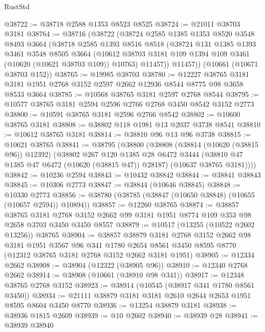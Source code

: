 \begin{lexlean}{RustStd}
\begin{coremodule}
@38722 := @38718 @2588 @1353 @8523 @8525
@38724 := @21011 @38703 @3181
@38764 := @38716
    (@38722
      (@38724
        @2585
        @1385
        @1353
        @8520
        @3548
        @8493
        @3664
        (@38718
          @2585
          @1393
          @8516
          @8518
          (@38724
            @131
            @1385
            @1393
            @3461
            @3548
            @8505
            @3664
            (@10612 @38703 @3181 @109 @1394 @109 @3461 (@10620 (@10621 @38703 @109)) @10763)
            @11457))
        @11457))
    (@10661 (@10671 @38703 @152))
@38765 := @19985 @38703
@38780 := @12227
    @38765
    @3181
    @3181
    @1951
    @2768
    @3152
    @2597
    @2662
    @12936
    @8544
    @8775
    @98
    @3658
    @8533
    @3664
@38785 := @10568 @38765 @3181 @2597 @2768 @8544
@38795 := @10577 @38765 @3181 @2594 @2596 @2766 @2768 @3450 @8542 @3152 @2773
@38800 := @10591 @38765 @3181 @2596 @2766 @8542
@38802 := @10600 @38765 @3181
@38808 := @38802 @118 @1981 @13 @2037 @3738 @8541
@38810 := @10612 @38765 @3181
@38814 := @38810 @96 @13 @96 @3738
@38815 := @10621 @38765
@38841 := @38795
    (@38800
      (@38808
        (@38814 (@10620 (@38815 @96)) @12392)
        (@38802
          @267
          @120
          @1385
          @28
          @6472
          @3444
          (@38810 @47 @1385 @47 @6472 (@10620 (@38815 @47)) @28187)
          (@10637 @38765 @3181))))
@38842 := @10236 @2594
@38843 := @10432 @38842
@38844 := @38841 @38843
@38845 := @10306 @2773
@38847 := @38844 (@10646 @38845)
@38848 := @10330 @2773
@38856 := @38780 (@38785 (@38847 (@10650 @38848) (@10655 (@10657 @2594)) @10894))
@38857 := @12260 @38765
@38874 := @38857
    @38765
    @3181
    @2768
    @3152
    @2662
    @99
    @3181
    @1951
    @8774
    @109
    @353
    @98
    @2658
    @3703
    @3450
    @3450
    @8557
@38879 := @10517 (@13255 (@10522 @2602 @13256)) @38765
@38904 := @38857
    @38879
    @3181
    @2768
    @3152
    @2662
    @98
    @3181
    @1951
    @3567
    @96
    @341
    @1780
    @2654
    @8561
    @3450
    @8595
    @8770
    (@12312 @38765 @3181 @2768 @3152 @2662 @3181 @1951)
@38905 := @12334 @2662
@38908 := @38904 (@12322 (@38905 @96))
@38910 := @12340 @2768 @2662
@38914 := @38908 (@10661 (@38910 @98 @341))
@38917 := @12348 @38765 @2768 @3152
@38923 := @38914 (@10545 (@38917 @341 @1780 @8561 @3450))
@38934 := @21111 @38879 @3181 @3181 @2610 @2644 @2653 @1951 @8595 @8604 @3450 @8770
@38936 := @13254 @38879 @3181
@38938 := @38936 @1815 @2609
@38939 := @10 @2602
@38940 := @38939 @28
@38941 := @38939 @38940

\end{coremodule}
\end{lexlean}
